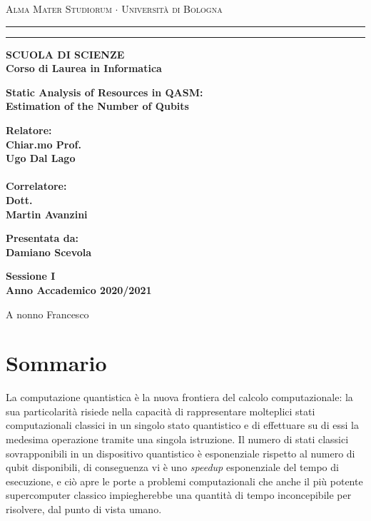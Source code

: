 \documentclass[12pt,a4paper]{report}
\theoremstyle{definition}
\theoremstyle{definition}
\theoremstyle{definition}
\newenvironment{dedication}
{%
\thispagestyle{empty}%
\vspace*{\stretch{1}}%
\itshape             %
\raggedleft          %
}
{\par %
\vspace{\stretch{3}} %
\clearpage           %
}
\begin{document}
\begin{titlepage}
\begin{center}
{{\Large{\textsc{Alma Mater Studiorum $\cdot$ Universit\`a di
Bologna}}}} \rule[0.1cm]{15.8cm}{0.1mm}
\rule[0.5cm]{15.8cm}{0.6mm}
{\small{\bf SCUOLA DI SCIENZE\\
Corso di Laurea in Informatica }}
\end{center}
\vspace{15mm}
\begin{center}
{\LARGE{\bf Static Analysis of Resources in QASM:}}\\
\vspace{3mm}
{\LARGE{\bf Estimation of the Number of Qubits}}\\
\end{center}
\vspace{40mm}
\par
\noindent
\begin{minipage}[t]{0.47\textwidth}
{\large{\bf Relatore:\\
Chiar.mo Prof.\\
Ugo Dal Lago\\
\\
Correlatore:\\
Dott.\\
Martin Avanzini\\
}}
\end{minipage}
\hfill
\begin{minipage}[t]{0.47\textwidth}\raggedleft
{\large{\bf Presentata da:\\
Damiano Scevola}}
\end{minipage}
\vspace{20mm}
\begin{center}
{\large{\bf Sessione I\\%
Anno Accademico 2020/2021}}%
\end{center}
\end{titlepage}

\begin{dedication}
A nonno Francesco
\end{dedication}

\chapter*{Sommario}
La computazione quantistica è la nuova frontiera del calcolo computazionale: la sua particolarità risiede nella capacità di rappresentare molteplici stati computazionali classici in un singolo stato quantistico e di effettuare su di essi la medesima operazione tramite una singola istruzione. Il numero di stati classici sovrapponibili in un dispositivo quantistico è esponenziale rispetto al numero di qubit disponibili, di conseguenza vi è uno \emph{speedup} esponenziale del tempo di esecuzione, e ciò apre le porte a problemi computazionali che anche il più potente supercomputer classico impiegherebbe una quantità di tempo inconcepibile per risolvere, dal punto di vista umano. 
\end{document}
